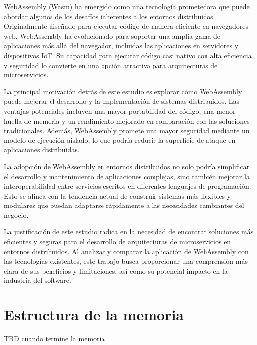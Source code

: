 WebAssembly (Wasm) ha emergido como una tecnología prometedora que puede abordar algunos de los desafíos inherentes a los entornos distribuidos. Originalmente diseñado para ejecutar código de manera eficiente en navegadores web, WebAssembly ha evolucionado para soportar una amplia gama de aplicaciones más allá del navegador, incluidas las aplicaciones en servidores y dispositivos IoT. Su capacidad para ejecutar código casi nativo con alta eficiencia y seguridad lo convierte en una opción atractiva para arquitecturas de microservicios.

La principal motivación detrás de este estudio es explorar cómo WebAssembly puede mejorar el desarrollo y la implementación de sistemas distribuidos. Las ventajas potenciales incluyen una mayor portabilidad del código, una menor huella de memoria y un rendimiento mejorado en comparación con las soluciones tradicionales. Además, WebAssembly promete una mayor seguridad mediante un modelo de ejecución aislado, lo que podría reducir la superficie de ataque en aplicaciones distribuidas.

La adopción de WebAssembly en entornos distribuidos no solo podría simplificar el desarrollo y mantenimiento de aplicaciones complejas, sino también mejorar la interoperabilidad entre servicios escritos en diferentes lenguajes de programación. Esto se alinea con la tendencia actual de construir sistemas más flexibles y modulares que puedan adaptarse rápidamente a las necesidades cambiantes del negocio.

La justificación de este estudio radica en la necesidad de encontrar soluciones más eficientes y seguras para el desarrollo de arquitecturas de microservicios en entornos distribuidos. Al analizar y comparar la aplicación de WebAssembly con las tecnologías existentes, este trabajo busca proporcionar una comprensión más clara de sus beneficios y limitaciones, así como su potencial impacto en la industria del software.

\section{Estructura de la memoria}

TBD cuando termine la memoria